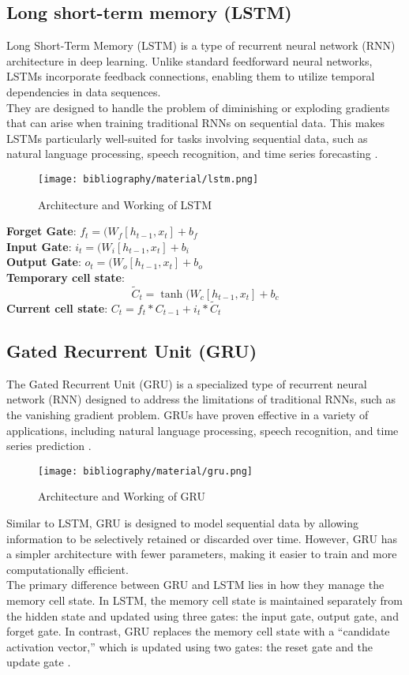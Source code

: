 \documentclass{ieeeojies}
\begin{document}
	\subsection{Long short-term memory (LSTM)}
	Long Short-Term Memory (LSTM) is a type of recurrent neural network (RNN) architecture in deep learning. Unlike standard feedforward neural networks, LSTMs incorporate feedback connections, enabling them to utilize temporal dependencies in data sequences.\\ 
	They are designed to handle the problem of diminishing or exploding gradients that can arise when training traditional RNNs on sequential data. This makes LSTMs particularly well-suited for tasks involving sequential data, such as natural language processing, speech recognition, and time series forecasting \cite{b13}.
	\begin{figure}[H] %
		\centering
		\texttt{[image: bibliography/material/lstm.png]}
		\caption{Architecture and Working of LSTM}
	\end{figure}
	\noindent \textbf{Forget Gate}: $f_t = (W_f[h_{t-1}, x_t] + b_f$ \\
	\textbf{Input Gate}: $i_t = (W_i[h_{t-1}, x_t] + b_i$ \\
	\textbf{Output Gate}: $o_t = (W_o[h_{t-1}, x_t] + b_o$\\
	\textbf{Temporary cell state}: \[\tilde{C}_t = \tanh(W_c[h_{t-1}, x_t] + b_c\]
	\textbf{Current cell state}: $C_t = f_t * C_{t-1} + i_t * \tilde{C}_t$ \cite{b14}
	
	\subsection{Gated Recurrent Unit (GRU)}
	The Gated Recurrent Unit (GRU) is a specialized type of recurrent neural network (RNN) designed to address the limitations of traditional RNNs, such as the vanishing gradient problem. GRUs have proven effective in a variety of applications, including natural language processing, speech recognition, and time series prediction \cite{b15}.
	\begin{figure}[H] %
		\centering
		\texttt{[image: bibliography/material/gru.png]}
		\caption{Architecture and Working of GRU}
	\end{figure}
	\noindent Similar to LSTM, GRU is designed to model sequential data by allowing information to be selectively retained or discarded over time. However, GRU has a simpler architecture with fewer parameters, making it easier to train and more computationally efficient.\\
	The primary difference between GRU and LSTM lies in how they manage the memory cell state. In LSTM, the memory cell state is maintained separately from the hidden state and updated using three gates: the input gate, output gate, and forget gate. In contrast, GRU replaces the memory cell state with a “candidate activation vector,” which is updated using two gates: the reset gate and the update gate \cite{b16}.
	
\end{document}

